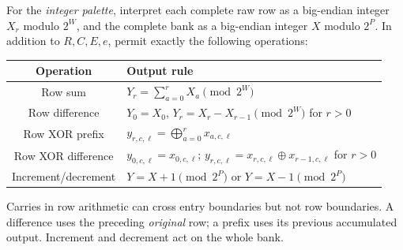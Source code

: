 For the \emph{integer palette}, interpret each complete raw row as a
big-endian integer $X_r$ modulo $2^W$, and the complete bank as a big-endian
integer $X$ modulo $2^P$.  In addition to $R,C,E,e$, permit exactly the
following operations:
\begin{center}
\begin{tabular}{c l}
\hline
Operation & Output rule \\
\hline
Row sum & $Y_r=\sum_{a=0}^{r}X_a\pmod{2^W}$ \\
Row difference & $Y_0=X_0$, $Y_r=X_r-X_{r-1}\pmod{2^W}$ for $r>0$ \\
Row XOR prefix & $y_{r,c,\ell}=\bigoplus_{a=0}^{r}x_{a,c,\ell}$ \\
Row XOR difference & $y_{0,c,\ell}=x_{0,c,\ell}$;
 $y_{r,c,\ell}=x_{r,c,\ell}\oplus x_{r-1,c,\ell}$ for $r>0$ \\
Increment/decrement & $Y=X+1\pmod{2^P}$ or $Y=X-1\pmod{2^P}$ \\
\hline
\end{tabular}
\end{center}
Carries in row arithmetic can cross entry boundaries but not row boundaries.
A difference uses the preceding \emph{original} row; a prefix uses its
previous accumulated output.  Increment and decrement act on the whole bank.

